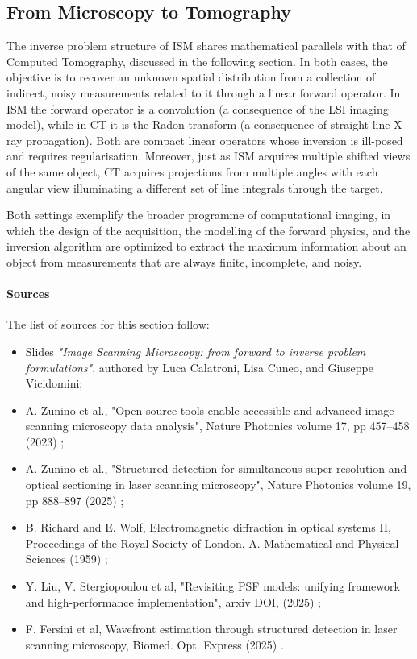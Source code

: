 \subsection{From Microscopy to Tomography}

The inverse problem structure of ISM shares mathematical parallels with that of Computed Tomography, discussed in the following section. In both cases, the objective is to recover an unknown spatial distribution from a collection of indirect, noisy measurements related to it through a linear forward operator. In ISM the forward operator is a convolution (a consequence of the LSI imaging model), while in CT it is the Radon transform (a consequence of straight-line X-ray propagation). Both are compact linear operators whose inversion is ill-posed and requires regularisation. Moreover, just as ISM acquires multiple shifted views of the same object, CT acquires projections from multiple angles with each angular view illuminating a different set of line integrals through the target. 

Both settings exemplify the broader programme of computational imaging, in which the design of the acquisition, the modelling of the forward physics, and the inversion algorithm are optimized to extract the maximum information about an object from measurements that are always finite, incomplete, and noisy.

\paragraph{Sources}

The list of sources for this section follow:
\begin{itemize}
    \item Slides \textit{"Image Scanning Microscopy: from forward to inverse problem formulations"}, authored by Luca Calatroni, Lisa Cuneo, and Giuseppe Vicidomini;
    \item A. Zunino et al., "Open-source tools enable accessible and advanced image scanning microscopy data analysis", Nature Photonics volume 17, pp 457–458 (2023) \cite{zunino_open-source_2023};
    \item A. Zunino et al., "Structured detection for simultaneous super-resolution and optical sectioning in laser scanning microscopy", Nature Photonics volume 19, pp 888–897 (2025) \cite{zunino_structured_2025};
    \item B. Richard and E. Wolf, Electromagnetic diffraction in optical systems II, Proceedings of the Royal Society of London. A. Mathematical and Physical Sciences (1959) \cite{richards_electromagnetic_1959};
    \item Y. Liu, V. Stergiopoulou et al, "Revisiting PSF models: unifying framework and high-performance implementation", arxiv DOI, (2025) \cite{liu_revisiting_2025};
    \item F. Fersini et al, Wavefront estimation through structured detection in laser scanning microscopy, Biomed. Opt. Express (2025) \cite{fersini_wavefront_2025}.
\end{itemize}
